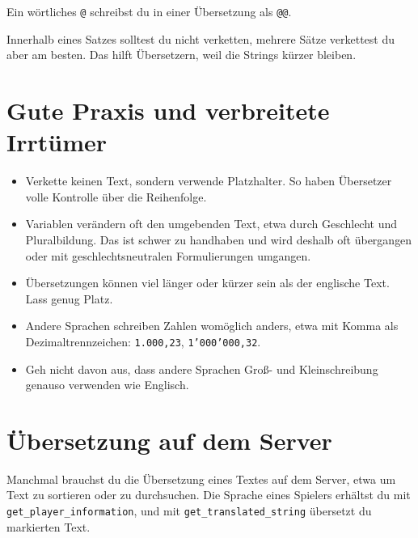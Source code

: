 Ein wörtliches \texttt{@} schreibst du in einer Übersetzung als
\texttt{@@}.

Innerhalb eines Satzes solltest du nicht verketten, mehrere Sätze
verkettest du aber am besten. Das hilft Übersetzern, weil die Strings
kürzer bleiben.

\begin{Shaded}
\begin{Highlighting}[]
\OperatorTok{(}\OperatorTok{,} \OperatorTok{)}
     
    \OperatorTok{(}\OperatorTok{,} \OperatorTok{\#}\OperatorTok{),}
\end{Highlighting}
\end{Shaded}

\section{Gute Praxis und verbreitete
Irrtümer}\label{gute-praxis-und-verbreitete-irrtuxfcmer}

\begin{itemize}
\tightlist
\item
  Verkette keinen Text, sondern verwende Platzhalter. So haben
  Übersetzer volle Kontrolle über die Reihenfolge.
\item
  Variablen verändern oft den umgebenden Text, etwa durch Geschlecht und
  Pluralbildung. Das ist schwer zu handhaben und wird deshalb oft
  übergangen oder mit geschlechtsneutralen Formulierungen umgangen.
\item
  Übersetzungen können viel länger oder kürzer sein als der englische
  Text. Lass genug Platz.
\item
  Andere Sprachen schreiben Zahlen womöglich anders, etwa mit Komma als
  Dezimaltrennzeichen: \texttt{1.\allowbreak{}000,23},
  \texttt{1'000'000,32}.
\item
  Geh nicht davon aus, dass andere Sprachen Groß- und Kleinschreibung
  genauso verwenden wie Englisch.
\end{itemize}

\section{Übersetzung auf dem
Server}\label{uxfcbersetzung-auf-dem-server}

Manchmal brauchst du die Übersetzung eines Textes auf dem Server, etwa
um Text zu sortieren oder zu durchsuchen. Die Sprache eines Spielers
erhältst du mit
\texttt{get\_\allowbreak{}player\_\allowbreak{}information}, und mit
\texttt{get\_\allowbreak{}translated\_\allowbreak{}string} übersetzt du
markierten Text.

